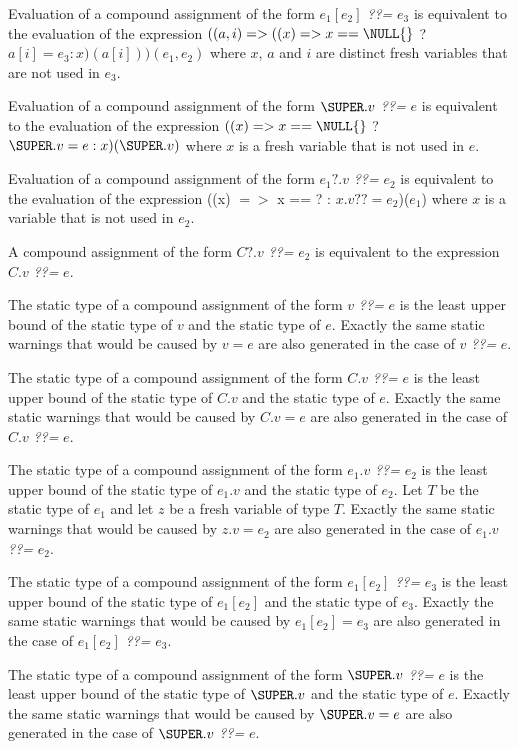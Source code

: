 \documentclass{article}
\newcommand{\code}[1]{{\sf #1}}
\begin{document}
\LMHash{}
Evaluation of a compound assignment of the form  $e_1[e_2]$  {\em ??=} $e_3$ is equivalent to the evaluation of the expression  
$((a, i) => ((x) => x == \NULL{}$ ?  $a[i] = e_3: x)(a[i]))(e_1, e_2)$ where $x$, $a$ and $i$ are distinct fresh variables that are not used in $e_3$. 

\LMHash{}
Evaluation of a compound assignment of the form $\SUPER.v$  {\em ??=} $e$ is equivalent to the evaluation of the expression  $((x) => x == \NULL{}$ ? $\SUPER.v = e: x)(\SUPER.v)$ where $x$ is a fresh variable that is not used in $e$.

\LMHash{}
Evaluation of a compound assignment of the form $e_1?.v$  {\em ??=} $e_2$ is equivalent to the evaluation of the expression \code{((x) $=>$ x == \NULL{} ?  \NULL: $x.v ??=  e_2$)($e_1$)} where $x$ is a variable that is not used in $e_2$. 

\LMHash{}
A compound assignment of the form $C?.v$  {\em ??=} $e_2$ is equivalent to the expression $C.v$ {\em ??=} $e$.

\LMHash{}
The static type of a compound assignment of the form $v$ {\em ??=} $e$ is the least upper bound of the static type of $v$ and the static type of $e$.  Exactly the same static warnings that would be caused by $v = e$ are also generated in the case of $v$ {\em ??=} $e$.


\LMHash{}
The static type of a compound assignment of the form  $C.v$ {\em ??=} $e$  is the least upper bound of the static type of $C.v$ and the static type of $e$.  Exactly the same static warnings that would be caused by $C.v = e$ are also generated in the case of $C.v$ {\em ??=} $e$.

\LMHash{}
The static type of a compound assignment of the form $e_1.v$  {\em ??=} $e_2$ is the least upper bound of the static type of $e_1.v$ and the static type of $e_2$. Let $T$ be the static type of $e_1$ and let $z$ be a fresh variable of type $T$. Exactly the same static warnings that would be caused by $z.v = e_2$ are also generated in the case of $e_1.v$  {\em ??=} $e_2$.

\LMHash{}
The static type of a compound assignment of the form $e_1[e_2]$  {\em ??=} $e_3$  is the least upper bound of the static type of $e_1[e_2]$ and the static type of $e_3$. Exactly the same static warnings that would be caused by $e_1[e_2] = e_3$ are also generated in the case of $e_1[e_2]$  {\em ??=} $e_3$.

\LMHash{}
The static type of a compound assignment of the form $\SUPER.v$  {\em ??=} $e$  is the least upper bound of the static type of $\SUPER.v$ and the static type of $e$. Exactly the same static warnings that would be caused by $\SUPER.v = e$ are also generated in the case of $\SUPER.v$  {\em ??=} $e$.
\end{document}
